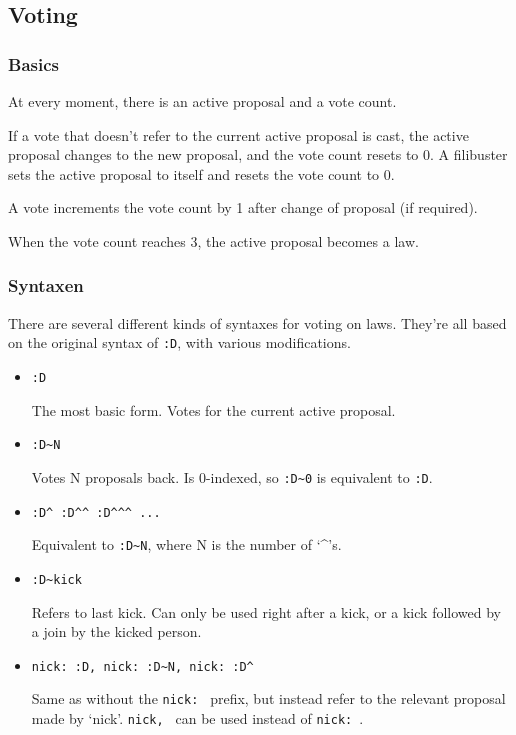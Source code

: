 \documentclass[11pt]{article}
\begin{document}
\subsection{Voting}


\subsubsection{Basics}

At every moment, there is an active proposal and a vote count.

If a vote that doesn't refer to the current active proposal is cast, the active proposal
changes to the new proposal, and the vote count resets to 0. A filibuster sets the active
proposal to itself and resets the vote count to 0.

A vote increments the vote count by 1 after change of proposal (if required).

When the vote count reaches 3, the active proposal becomes a law.


\subsubsection{Syntaxen}
There are several different kinds of syntaxes for voting on laws. They're all based
on the original syntax of \texttt{:D}, with various modifications.

\begin{itemize}
\item \texttt{:D}

The most basic form. Votes for the current active proposal.

\item \texttt{:D\~{}N}

Votes N proposals back. Is 0-indexed, so \texttt{:D\~{}0} is equivalent to \texttt{:D}.

\item \texttt{:D\^{} :D\^{}\^{} :D\^{}\^{}\^{} ...}

Equivalent to \texttt{:D\~{}N}, where N is the number of `\^{}'s.

\item \texttt{:D\~{}kick}

Refers to last kick. Can only be used right after a kick, or a kick followed by a join
by the kicked person.

\item \texttt{nick: :D, nick: :D\~{}N, nick: :D\^{}}

Same as without the \texttt{nick: } prefix, but instead refer to the relevant proposal
made by `nick'. \texttt{nick, } can be used instead of \texttt{nick: }.
\end{itemize}
\end{document}
